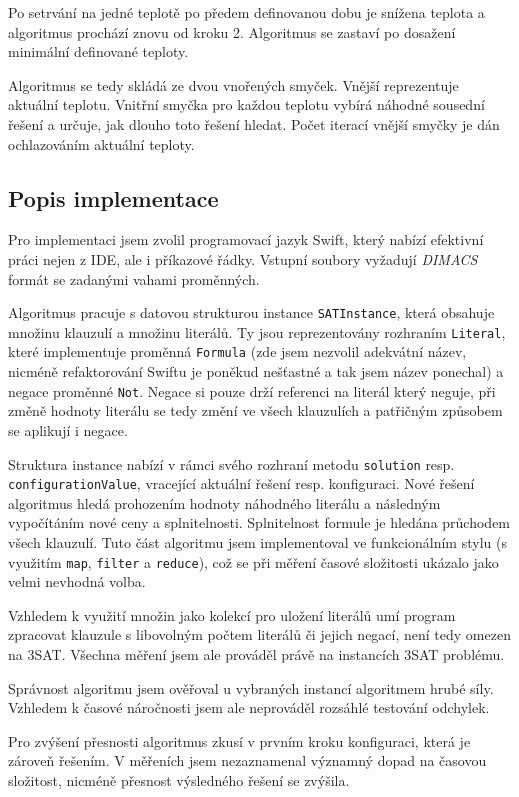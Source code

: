 \documentclass[czech]{article}
\begin{document}
Po setrvání na jedné teplotě po předem definovanou dobu je snížena teplota a algoritmus prochází znovu od kroku 2.
Algoritmus se zastaví po dosažení minimální definované teploty.

Algoritmus se tedy skládá ze dvou vnořených smyček.
Vnější reprezentuje aktuální teplotu.
Vnitřní smyčka pro každou teplotu vybírá náhodné sousední řešení a určuje, jak dlouho toto řešení hledat.
Počet iterací vnější smyčky je dán ochlazováním aktuální teploty.

\subsection{Popis implementace}

Pro implementaci jsem zvolil programovací jazyk Swift, který nabízí efektivní práci nejen z IDE, ale i příkazové řádky.
Vstupní soubory vyžadují \textit{DIMACS} formát se zadanými vahami proměnných.

Algoritmus pracuje s datovou strukturou instance \texttt{SATInstance}, která obsahuje množinu klauzulí a množinu literálů.
Ty jsou reprezentovány rozhraním \texttt{Literal}, které implementuje proměnná \texttt{Formula} (zde jsem nezvolil adekvátní název, nicméně refaktorování Swiftu je poněkud nešťastné a tak jsem název ponechal) a negace proměnné \texttt{Not}.
Negace si pouze drží referenci na literál který neguje, při změně hodnoty literálu se tedy změní ve všech klauzulích a patřičným způsobem se aplikují i negace.

Struktura instance nabízí v rámci svého rozhraní metodu \texttt{solution} resp. \texttt{configurationValue}, vracející aktuální řešení resp. konfiguraci.
Nové řešení algoritmus hledá prohozením hodnoty náhodného literálu a následným vypočítáním nové ceny a splnitelnosti.
Splnitelnost formule je hledána průchodem všech klauzulí.
Tuto část algoritmu jsem implementoval ve funkcionálním stylu (s využitím \texttt{map}, \texttt{filter} a \texttt{reduce}), což se při měření časové složitosti ukázalo jako velmi nevhodná volba.

Vzhledem k využití množin jako kolekcí pro uložení literálů umí program zpracovat klauzule s libovolným počtem literálů či jejich negací, není tedy omezen na 3SAT.
Všechna měření jsem ale prováděl právě na instancích 3SAT problému.

Správnost algoritmu jsem ověřoval u vybraných instancí algoritmem hrubé síly.
Vzhledem k časové náročnosti jsem ale neprováděl rozsáhlé testování odchylek.

Pro zvýšení přesnosti algoritmus zkusí v prvním kroku  konfiguraci, která je zároveň řešením.
V měřeních jsem nezaznamenal významný dopad na časovou složitost, nicméně přesnost výsledného řešení se zvýšila.
\end{document}
